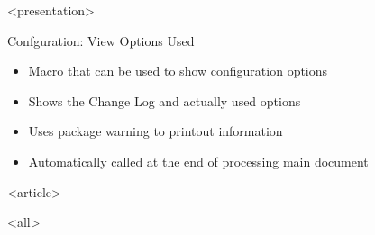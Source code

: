 \mode
<presentation>

\begin{frame}{Confguration: View Options Used}
  \label{start:used:options}

  \begin{itemize}
    \item Macro that can be used to show configuration options
    \item Shows the Change Log and actually used options
    \item Uses package warning to printout information
    \item Automatically called at the end of processing main document
  \end{itemize}

  \begin{example}[Root path Change Log and Option]
    }
    }
  \end{example}

\end{frame}


\mode
<article>

\bigskip


\clearpage

\mode
<all>
